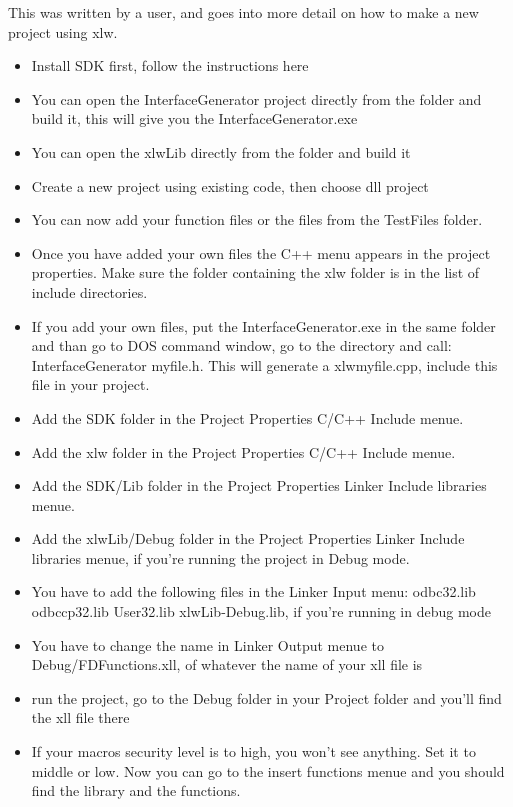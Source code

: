 \documentclass[12pt,reqno]{amsart}
\numberwithin{equation}{section}
\numberwithin{figure}{section}
\begin{document}
This was written by a user, and goes into more detail on how to  make
a new project using xlw. 
\begin{itemize}
\item  Install SDK first, follow the instructions here
\item You can open the InterfaceGenerator project directly from the folder and build it, this will give you the InterfaceGenerator.exe
\item You can open the xlwLib directly from the folder and build it
\item Create a new project using existing code, then choose dll project
\item You can now add your function files or the files from the
  TestFiles folder.
\item Once you have added your own files the C++ menu appears in
  the project properties. Make sure the folder containing the xlw
  folder is in the list of include directories.
\item If you add your own files, put the InterfaceGenerator.exe in the same folder and than go to DOS command window, go to the directory and call: InterfaceGenerator myfile.h. This will generate a xlwmyfile.cpp, include this file in your project.
\item Add the SDK folder in the Project Properties C/C++ Include menue.
\item Add the xlw folder in the Project Properties C/C++ Include menue.
\item Add the SDK/Lib folder in the Project Properties Linker Include libraries menue.
\item Add the xlwLib/Debug folder in the Project Properties Linker Include libraries menue, if you're running the project in Debug mode.
\item You have to add the following files in the Linker Input menu: odbc32.lib odbccp32.lib User32.lib xlwLib-Debug.lib, if you're running in debug mode
\item You have to change the name in Linker Output menue to Debug/FDFunctions.xll, of whatever the name of your xll file is
\item run the project, go to the Debug folder in your Project folder and you'll find the xll file there
\item If your macros security level is to high, you won't see anything. Set it to middle or low. Now you can go to the insert functions menue and you should find the library and the functions.
\end{itemize}
\end{document}
